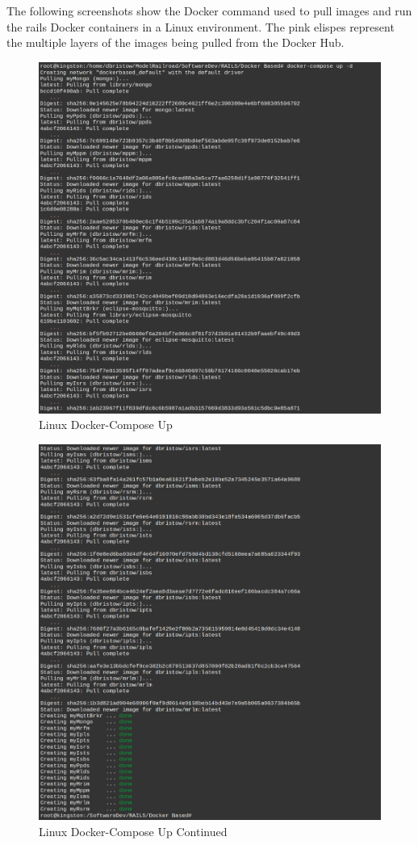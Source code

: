 The following screenshots show the Docker command used to pull images and run the \gls{rails} Docker containers in a Linux environment. The pink elispes represent the multiple layers of the images being pulled from the Docker Hub.
\begin{figure}[H]
    \centering
    \includegraphics[scale=0.44]{win2l.png}
    \caption{Linux Docker-Compose Up}
    \label{fig:linux-docker-cmds-2}
\end{figure}
\begin{figure}[H]
    \centering
    \includegraphics[scale=0.44]{win3l.png}
    \caption{Linux Docker-Compose Up Continued}
    \label{fig:linux-docker-cmds-3}
\end{figure}
